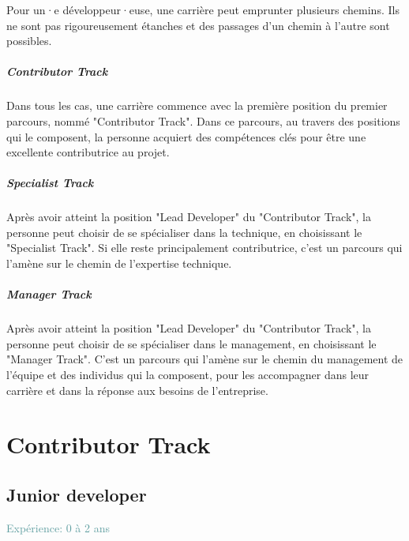 \documentclass[a4paper, french, openany, 12pt]{book}
\newcommand\xp[1]{\textcolor{CadetBlue}{Expérience: {#1} ans}}
\newcommand\dev{développeur·euse}
\begin{document}
\begin{multicols}{2}
  Pour un·e \dev, une carrière peut emprunter plusieurs chemins.
  Ils ne sont pas rigoureusement étanches et des passages d'un chemin à l'autre sont possibles.

  \subsubsection*{Contributor Track}

  Dans tous les cas, une carrière commence avec la première position du premier parcours, nommé "Contributor Track".
  Dans ce parcours, au travers des positions qui le composent, la personne acquiert des compétences clés pour être une
  excellente contributrice au projet.

  \subsubsection*{Specialist Track}

  Après avoir atteint la position "Lead Developer" du "Contributor Track", la personne peut choisir de se spécialiser 
  dans la technique, en choisissant le "Specialist Track".
  Si elle reste principalement contributrice, c'est un parcours qui l'amène sur le chemin de l'expertise technique.

  \subsubsection*{Manager Track}

  Après avoir atteint la position "Lead Developer" du "Contributor Track", la personne peut choisir de se spécialiser 
  dans le management, en choisissant le "Manager Track".
  C'est un parcours qui l'amène sur le chemin du management de l'équipe et des individus qui la composent, pour les
  accompagner dans leur carrière et dans la réponse aux besoins de l'entreprise.

\end{multicols}

\part{Contributor Track}

\chapter{Junior developer}

\xp{0 à 2}
\end{document}
